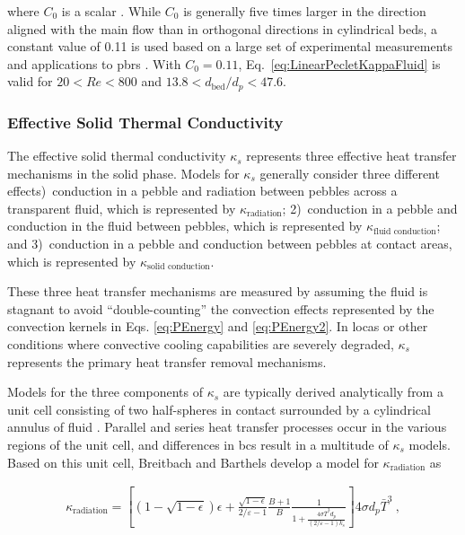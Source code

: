 \noindent where \(C_0\) is a scalar \cite{yagi1957, schertz, tsotsas, yagi,amiri,amiri1995,delgado}. While \(C_0\) is generally five times larger in the direction aligned with the main flow than in orthogonal directions in cylindrical beds, a constant value of 0.11 is used based on a large set of experimental measurements and applications to \glspl{pbr} \cite{yagi1957,auwerda_2011,delgado,amiri1995,yagi,tsotsas}. With \(C_0=0.11\), Eq.\ \eqref{eq:LinearPecletKappaFluid} is valid for \(20<Re<800\) and \(13.8<d_\text{bed}/d_p<47.6\).

\subsubsection{Effective Solid Thermal Conductivity}
\label{sec:KappaS}

The effective solid thermal conductivity \(\kappa_s\) represents three effective heat transfer mechanisms in the solid phase. Models for \(\kappa_s\) generally consider three different effects)~conduction in a pebble and radiation between pebbles across a transparent fluid, which is represented by \(\kappa_\text{radiation}\); 2)~conduction in a pebble and conduction in the fluid between pebbles, which is represented by \(\kappa_\textrm{fluid conduction}\); and 3)~conduction in a pebble and conduction between pebbles at contact areas, which is represented by \(\kappa_\textrm{solid conduction}\).

These three heat transfer mechanisms are measured by assuming the fluid is stagnant to avoid ``double-counting'' the convection effects represented by the convection kernels in Eqs. \eqref{eq:PEnergy} and \eqref{eq:PEnergy2}. In \glspl{loca} or other conditions where convective cooling capabilities are severely degraded, \(\kappa_s\) represents the primary heat transfer removal mechanisms. 

Models for the three components of \(\kappa_s\) are typically derived analytically from a unit cell consisting of two half-spheres in contact surrounded by a cylindrical annulus of fluid \cite{breitbach}. Parallel and series heat transfer processes occur in the various regions of the unit cell, and differences in \glspl{bc} result in a multitude of \(\kappa_s\) models. Based on this unit cell, Breitbach and Barthels develop a model for \(\kappa_\text{radiation}\) as

\begin{equation}
\begin{aligned}
\label{eq:KappaRadiationBB}
\kappa_\text{radiation}=\left\lbrack\left(1-\sqrt{1-\epsilon}\right)\epsilon+\frac{\sqrt{1-\epsilon}}{2/\varepsilon-1}\frac{B+1}{B}\frac{1}{1+\frac{4\sigma\bar{T}^3d_p}{(2/\varepsilon-1)k_s}}\right\rbrack4\sigma d_p\bar{T}^{3}\ ,
\end{aligned}
\end{equation}

